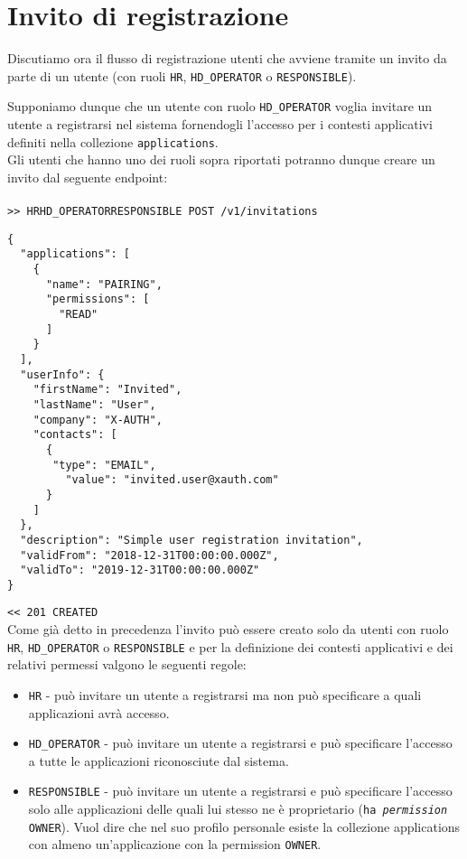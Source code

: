 \documentclass[a4paper,12pt]{article}
\begin{document}
\section{Invito di registrazione}

Discutiamo ora il flusso di registrazione utenti che avviene tramite un invito da parte di un utente (con ruoli \texttt{HR}, \texttt{HD\_OPERATOR} o \texttt{RESPONSIBLE}).

Supponiamo dunque che un utente con ruolo \texttt{HD\_OPERATOR} voglia invitare un utente a registrarsi nel sistema fornendogli l’accesso per i contesti applicativi definiti nella collezione \texttt{applications}. \\

Gli utenti che hanno uno dei ruoli sopra riportati potranno dunque creare un invito dal seguente endpoint: \\
\\
\texttt{>> HR\textbar HD\_OPERATOR\textbar RESPONSIBLE POST /v1/invitations}
\begin{lstlisting}
{
  "applications": [
    {
      "name": "PAIRING",
      "permissions": [
        "READ"
      ]
    }
  ],
  "userInfo": {
    "firstName": "Invited",
    "lastName": "User",
    "company": "X-AUTH",
    "contacts": [
      {
	   "type": "EMAIL",
         "value": "invited.user@xauth.com"
      }
    ]
  },
  "description": "Simple user registration invitation",
  "validFrom": "2018-12-31T00:00:00.000Z",
  "validTo": "2019-12-31T00:00:00.000Z"
}
\end{lstlisting}
\texttt{<< 201 CREATED} \\

Come già detto in precedenza l’invito può essere creato solo da utenti con ruolo \texttt{HR}, \texttt{HD\_OPERATOR} o \texttt{RESPONSIBLE} e per la definizione dei contesti applicativi e dei relativi permessi valgono le seguenti regole: \\

\begin{itemize}
	\item \texttt{HR} - può invitare un utente a registrarsi ma non può specificare a quali applicazioni avrà accesso.
	\item \texttt{HD\_OPERATOR} - può invitare un utente a registrarsi e può specificare l’accesso a tutte le applicazioni riconosciute dal sistema.
	\item \texttt{RESPONSIBLE} - può invitare un utente a registrarsi e può specificare l’accesso solo alle applicazioni delle quali lui stesso ne è proprietario (\texttt{ha \textit{permission} OWNER}). Vuol dire che nel suo profilo personale esiste la collezione applications con almeno un’applicazione con la permission \texttt{OWNER}.
\end{itemize} \\
\end{document}
